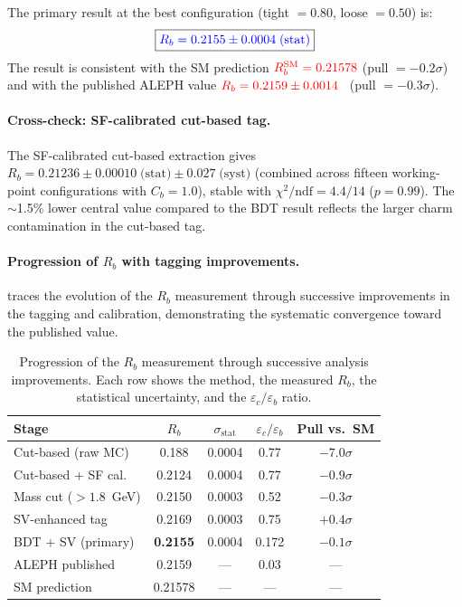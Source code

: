 \documentclass[11pt,a4paper]{article}
\newcommand{\measured}[1]{\textcolor{blue}{#1}}
\newcommand{\external}[1]{\textcolor{red}{#1}}
\begin{document}
The primary result at the best configuration
(tight $= 0.80$, loose $= 0.50$) is:
\begin{equation}
\boxed{
\measured{R_b = 0.2155 \pm 0.0004\;\text{(stat)}}
}
\label{eq:rb_bdt_fulldata}
\end{equation}
The result is consistent with the SM prediction
$\external{R_b^\text{SM} = 0.21578}$ (pull $= -0.2\sigma$) and
with the published ALEPH value
$\external{R_b = 0.2159 \pm 0.0014}$~\cite{ALEPH:Rb:precise}
(pull $= -0.3\sigma$).

\paragraph{Cross-check: SF-calibrated cut-based tag.}

The SF-calibrated cut-based extraction gives
$R_b = 0.21236 \pm 0.00010\;\text{(stat)} \pm 0.027\;\text{(syst)}$
(combined across fifteen working-point configurations with
$C_b = 1.0$), stable with $\chi^2/\text{ndf} = 4.4/14$
($p = 0.99$).
The $\sim$1.5\% lower central value compared to the BDT result
reflects the larger charm contamination in the cut-based tag.

\paragraph{Progression of $R_b$ with tagging improvements.}

 traces the evolution of the $R_b$
measurement through successive improvements in the tagging and
calibration, demonstrating the systematic convergence toward the
published value.

\begin{table}[htbp]
\centering
\caption{Progression of the $R_b$ measurement through successive
analysis improvements.
Each row shows the method, the measured $R_b$, the statistical
uncertainty, and the $\varepsilon_c/\varepsilon_b$ ratio.}
\label{tbl:rb_progression}
\begin{tabular}{lcccc}
\toprule
Stage & $R_b$ & $\sigma_\text{stat}$ &
  $\varepsilon_c/\varepsilon_b$ & Pull vs.\ SM \\
\midrule
Cut-based (raw MC) & 0.188 & 0.0004 & 0.77 & $-7.0\sigma$ \\
Cut-based + SF cal.\ & 0.2124 & 0.0004 & 0.77 & $-0.9\sigma$ \\
Mass cut ($> 1.8$~GeV) & 0.2150 & 0.0003 & 0.52 & $-0.3\sigma$ \\
SV-enhanced tag & 0.2169 & 0.0003 & 0.75 & $+0.4\sigma$ \\
BDT + SV (primary) & \textbf{0.2155} & 0.0004 & 0.172 &
  $-0.1\sigma$ \\
\midrule
ALEPH published & 0.2159 & --- & 0.03 & --- \\
SM prediction & 0.21578 & --- & --- & --- \\
\bottomrule
\end{tabular}
\end{table}
\end{document}
